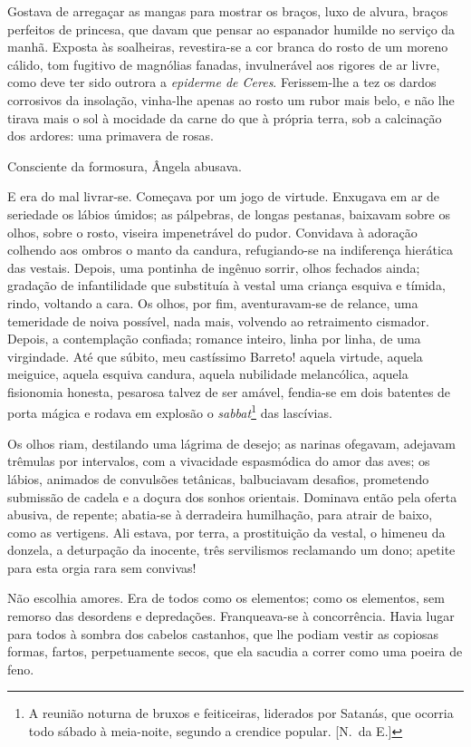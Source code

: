 Gostava de arregaçar as mangas para mostrar os braços, luxo de alvura,
braços perfeitos de princesa, que davam que pensar ao espanador humilde
no serviço da manhã. Exposta às soalheiras, revestira{}-se a cor branca do
rosto de um moreno cálido, tom fugitivo de magnólias fanadas,
invulnerável aos rigores de ar livre, como deve ter sido outrora a
\textit{epiderme de Ceres}. Ferissem{}-lhe a tez os dardos corrosivos da
insolação, vinha{}-lhe apenas ao rosto um rubor mais belo, e não lhe
tirava mais o sol à mocidade da carne do que à própria terra, sob a
calcinação dos ardores: uma primavera de rosas. 

Consciente da formosura, Ângela abusava. 

E era do mal livrar{}-se. Começava por um
jogo de virtude. Enxugava em ar de seriedade os lábios úmidos; as
pálpebras, de longas pestanas, baixavam sobre os olhos, sobre o rosto,
viseira impenetrável do pudor. Convidava à adoração colhendo aos ombros
o manto da candura, refugiando{}-se na indiferença hierática das vestais.
Depois, uma pontinha de ingênuo sorrir, olhos fechados ainda; gradação
de infantilidade que substituía à vestal uma criança esquiva e tímida,
rindo, voltando a cara. Os olhos, por fim, aventuravam{}-se de relance,
uma temeridade de noiva possível, nada mais, volvendo ao retraimento
cismador. Depois, a contemplação confiada; romance inteiro, linha por
linha, de uma virgindade. Até que súbito, meu castíssimo Barreto!
aquela virtude, aquela meiguice, aquela esquiva candura, aquela
nubilidade melancólica, aquela fisionomia honesta, pesarosa talvez de
ser amável, fendia{}-se em dois batentes de porta mágica e rodava em
explosão o \textit{sabbat}\footnote{ A reunião noturna de bruxos e 
feiticeiras, liderados por Satanás, que ocorria todo sábado à meia-noite, 
segundo a crendice popular. [N.~da E.]} das lascívias. 

Os olhos riam, destilando uma lágrima
de desejo; as narinas ofegavam, adejavam trêmulas por intervalos, com a
vivacidade espasmódica do amor das aves; os lábios, animados de
convulsões tetânicas, balbuciavam desafios, prometendo submissão de
cadela e a doçura dos sonhos orientais. Dominava então pela oferta
abusiva, de repente; abatia{}-se à derradeira humilhação, para atrair
de baixo, como as vertigens. Ali estava, por terra, a prostituição da
vestal, o himeneu da donzela, a deturpação da inocente, três
servilismos reclamando um dono; apetite para esta orgia rara sem
convivas! 

Não escolhia amores. Era de todos como os elementos; como os
elementos, sem remorso das desordens e depredações. Franqueava{}-se à
concorrência. Havia lugar para todos à sombra dos cabelos castanhos,
que lhe podiam vestir as copiosas formas, fartos, perpetuamente secos,
que ela sacudia a correr como uma poeira de feno. 

